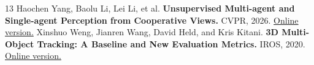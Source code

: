 \begin{thebibliography}{13}
 Haochen Yang, Baolu Li, Lei Li, et al. \textbf{Unsupervised Multi-agent and Single-agent Perception from Cooperative Views.} CVPR, 2026. \href{https://openaccess.thecvf.com/content/CVPR2026/html/Yang_Unsupervised_Multi-agent_and_Single-agent_Perception_from_Cooperative_Views_CVPR_2026_paper.html}{Online version.}
 Xinshuo Weng, Jianren Wang, David Held, and Kris Kitani. \textbf{3D Multi-Object Tracking: A Baseline and New Evaluation Metrics.} IROS, 2020. \href{https://arxiv.org/abs/1907.03961}{Online version.}
\end{thebibliography}
